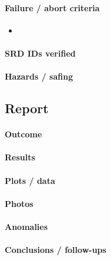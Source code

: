 \paragraph{Failure / abort criteria}
\begin{itemize}
  \item \todo{}
\end{itemize}

\paragraph{SRD IDs verified}
\todo{}

\paragraph{Hazards / safing}
\todo{}

\subsection*{Report}

\paragraph{Outcome}

\paragraph{Results}
\todo{}

\paragraph{Plots / data}
\todo{}

\paragraph{Photos}
\todo{}

\paragraph{Anomalies}
\todo{}

\paragraph{Conclusions / follow-ups}
\todo{}
